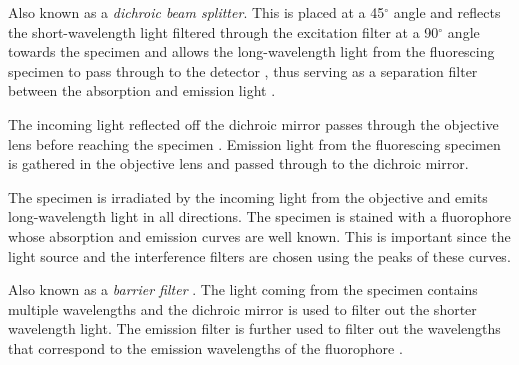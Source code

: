 \begin{definition}
	Also known as a \textit{dichroic beam splitter}.
	This is placed at a 45$^{\circ}$ angle and reflects the short-wavelength light filtered through the excitation filter at a 90$^{\circ}$ angle towards the specimen \citep{Spring2003,CudeBurke2014} and allows the long-wavelength light from the fluorescing specimen to pass through to the detector \citep{LichtmanConchello2005,Koch1972}, thus serving as a separation filter between the absorption and emission light \citep{Fatima2008,Dobrucki2013}.
\end{definition}

\begin{definition}[Objective]
	The incoming light reflected off the dichroic mirror passes through the objective lens before reaching the specimen \citep{LichtmanConchello2005,Spring2003}.
	Emission light from the fluorescing specimen is gathered in the objective lens and passed through to the dichroic mirror.
\end{definition}

\begin{definition}[Specimen]
	The specimen is irradiated by the incoming light from the objective and emits long-wavelength light in all directions.
	The specimen is stained with a fluorophore whose absorption and emission curves are well known.
	This is important since the light source and the interference filters are chosen using the peaks of these curves.
\end{definition}

\begin{definition}
	Also known as a \textit{barrier filter} \citep{LichtmanConchello2005,Spring2003,Koch1972}.
	The light coming from the specimen contains multiple wavelengths and the dichroic mirror is used to filter out the shorter wavelength light.
	The emission filter is further  used to filter out the wavelengths that correspond to the emission wavelengths of the fluorophore \citep{SpringDavisdson2016,ThermoFisher2016}.
\end{definition}


